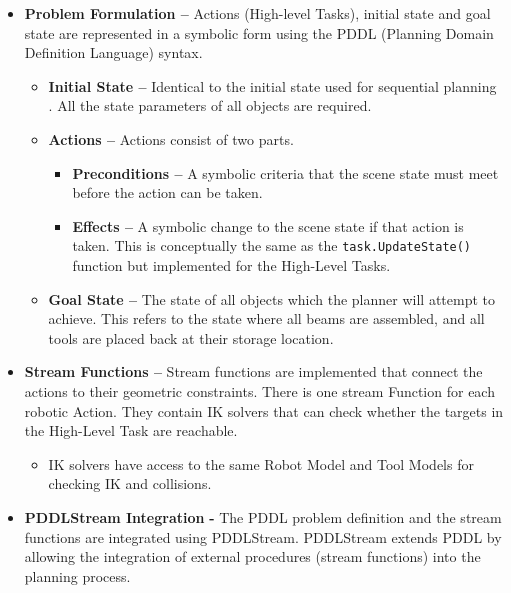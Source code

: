 \begin{itemize}
	\item \textbf{Problem Formulation --} Actions (High-level Tasks), initial state and goal state are represented in a symbolic form using the PDDL (Planning Domain Definition Language) syntax.

\begin{itemize}
	\item \textbf{Initial State --} Identical to the initial state used for sequential planning . All the state parameters of all objects are required.

	\item \textbf{Actions --} Actions consist of two parts. 

\begin{itemize}
	\item \textbf{Preconditions --} A symbolic criteria that the scene state must meet before the action can be taken. 

	\item \textbf{Effects --} A symbolic change to the scene state if that action is taken. This is conceptually the same as the \verb|task.UpdateState()| function  but implemented for the High-Level Tasks.

\end{itemize}
	\item \textbf{Goal State --} The state of all objects which the planner will attempt to achieve. This refers to the state where all beams are assembled, and all tools are placed back at their storage location.

\end{itemize}
	\item \textbf{Stream Functions --} Stream functions are implemented that connect the actions to their geometric constraints. There is one stream Function for each robotic Action. They contain IK solvers that can check whether the targets in the High-Level Task are reachable.

\begin{itemize}
	\item IK solvers have access to the same Robot Model and Tool Models  for checking IK and collisions.

\end{itemize}
	\item \textbf{PDDLStream Integration} \textbf{-} The PDDL problem definition and the stream functions are integrated using PDDLStream. PDDLStream extends PDDL by allowing the integration of external procedures (stream functions) into the planning process.


\end{itemize}
